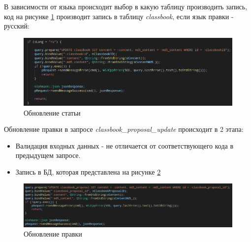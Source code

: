 В зависимости от языка происходит выбор в какую таблицу производить запись, 
код на рисунке \ref{fig:code_update_classbook} производит запись в таблицу \emph{classbook},
если язык правки - русский:

\begin{figure}[!h]
    \centering
    \includegraphics[width=0.8\linewidth]{images/code_update_classbook.png}
    \caption{Обновление статьи}
    \label{fig:code_update_classbook}
\end{figure}

Обновление правки в запросе \emph{classbook\_proposal\_update} происходит в 2 этапа:
\begin{itemize}
    \item Валидация входных данных - не отличается от соответствующего кода в предыдущем запросе.
    \item Запись в БД, которая представлена на рисунке \ref{fig:proposal_update}
\end{itemize}

\begin{figure}[!h]
    \centering
    \includegraphics[width=0.8\linewidth]{images/proposal_update.png}
    \caption{Обновление правки}
    \label{fig:proposal_update}
\end{figure}